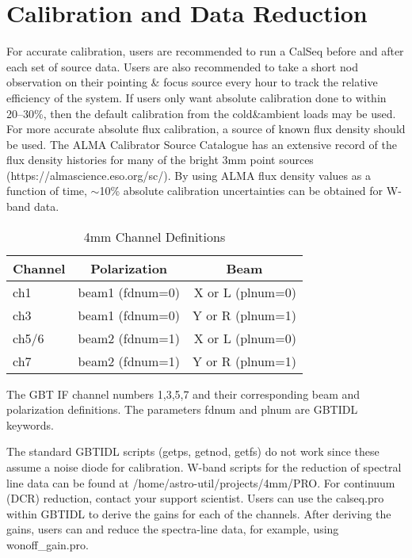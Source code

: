 \section{Calibration and Data Reduction}


For accurate calibration, users are recommended to run a CalSeq before
and after each set of source data.  Users are also recommended to take
a short nod observation on their pointing \& focus source every hour
to track the relative efficiency of the system.  If users only want
absolute calibration done to within 20--30\%, then the default
calibration from the cold\&ambient loads may be used.  For more
accurate absolute flux calibration, a source of known flux density
should be used.  The ALMA Calibrator Source Catalogue has an extensive
record of the flux density histories for many of the bright 3mm point
sources (https://almascience.eso.org/sc/).  By using ALMA flux density
values as a function of time, $\sim$10\% absolute calibration
uncertainties can be obtained for W-band data.

\begin{table*}
\begin{center}
    \caption{4mm Channel Definitions}
    \begin{tabular}{lrr}
      \hline 
      \hline 
      \multicolumn{1}{l}{Channel} &
      \multicolumn{1}{c}{Polarization} & 
      \multicolumn{1}{c}{Beam}\\
      \hline

ch1& beam1 (fdnum=0) & X or L (plnum=0)\\
ch3& beam1 (fdnum=0) & Y or R (plnum=1)\\
ch5/6& beam2 (fdnum=1) & X or L (plnum=0)\\
ch7& beam2 (fdnum=1) & Y or R (plnum=1)\\
  \hline 
   \end{tabular}
\end{center}

 The GBT IF channel numbers 1,3,5,7 and
their corresponding beam and polarization definitions.  The parameters
fdnum and plnum are GBTIDL keywords.
\end{table*}

The standard GBTIDL scripts (getps, getnod, getfs) do not work since
these assume a noise diode for calibration. W-band scripts for the
reduction of spectral line data can be found at
/home/astro-util/projects/4mm/PRO. For continuum (DCR) reduction,
contact your support scientist.  Users can use the calseq.pro within
GBTIDL to derive the gains for each of the channels.  After deriving
the gains, users can and reduce the spectra-line data, for example,
using wonoff\_gain.pro.

